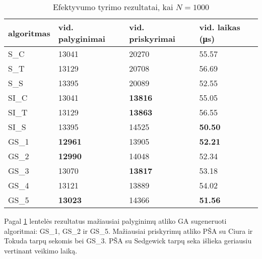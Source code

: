 \documentclass{VUMIFInfKursinis}
\begin{document}
\begin{table}[H]
  \caption{Efektyvumo tyrimo rezultatai, kai $N = 1000$}
  \label{results_1000}
  \centering
  \begin{tabular}{@{}llll@{}}
  algoritmas & vid. palyginimai                       & vid. priskyrimai                       & vid. laikas (μs)                       \\ \midrule
  S\_C       & 13041                                  & 20270                                  & 55.57                                  \\
  S\_T       & 13129                                  & 20708                                  & 56.69                                  \\
  S\_S       & 13395                                  & 20089                                  & 52.55                                  \\
  SI\_C      & 13041                                  & \cellcolor[HTML]{70AD47}\textbf{13816} & 55.05                                  \\
  SI\_T      & 13129                                  & \cellcolor[HTML]{70AD47}\textbf{13863} & 56.55                                  \\
  SI\_S      & 13395                                  & 14525                                  & \cellcolor[HTML]{70AD47}\textbf{50.50} \\
  GS\_1      & \cellcolor[HTML]{70AD47}\textbf{12961} & 13905                                  & \cellcolor[HTML]{70AD47}\textbf{52.21} \\
  GS\_2      & \cellcolor[HTML]{70AD47}\textbf{12990} & 14048                                  & 52.34                                  \\
  GS\_3      & 13070                                  & \cellcolor[HTML]{70AD47}\textbf{13817} & 53.18                                  \\
  GS\_4      & 13121                                  & 13889                                  & 54.02                                  \\
  GS\_5      & \cellcolor[HTML]{70AD47}\textbf{13023} & 14366                                  & \cellcolor[HTML]{70AD47}\textbf{51.56} \\ \bottomrule
  \end{tabular}
\end{table}

Pagal \ref{results_1000} lentelės rezultatus
mažiausiai palyginimų atliko GA sugeneruoti algoritmai: GS\_1, GS\_2 ir GS\_5.
Mažiausiai priskyrimų atliko PŠA su Ciura ir Tokuda tarpų sekomis bei GS\_3.
PŠA su Sedgewick tarpų seka išlieka geriausiu vertinant veikimo laiką.
\end{document}
